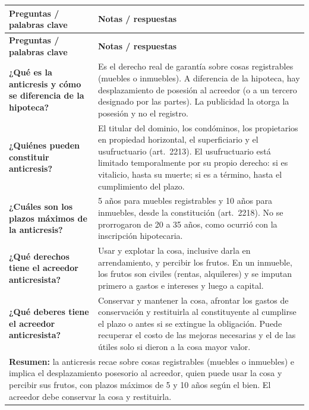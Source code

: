 \documentclass[12pt,oneside]{book}
\begin{document}
\begin{longtable}{p{}p{}}
\toprule
\textbf{Preguntas / palabras clave} & \textbf{Notas / respuestas} \\
\midrule
\endfirsthead
\toprule
\textbf{Preguntas / palabras clave} & \textbf{Notas / respuestas} \\
\midrule
\endhead

\textbf{¿Qué es la anticresis y cómo se diferencia de la hipoteca?} &
Es el derecho real de garantía sobre cosas registrables (muebles o inmuebles). A diferencia de la hipoteca, hay desplazamiento de posesión al acreedor (o a un tercero designado por las partes). La publicidad la otorga la posesión y no el registro. \\[0.6em]

\textbf{¿Quiénes pueden constituir anticresis?} &
El titular del dominio, los condóminos, los propietarios en propiedad horizontal, el superficiario y el usufructuario (art.\ 2213). El usufructuario está limitado temporalmente por su propio derecho: si es vitalicio, hasta su muerte; si es a término, hasta el cumplimiento del plazo. \\[0.6em]

\textbf{¿Cuáles son los plazos máximos de la anticresis?} &
5 años para muebles registrables y 10 años para inmuebles, desde la constitución (art.\ 2218). No se prorrogaron de 20 a 35 años, como ocurrió con la inscripción hipotecaria. \\[0.6em]

\textbf{¿Qué derechos tiene el acreedor anticresista?} &
Usar y explotar la cosa, inclusive darla en arrendamiento, y percibir los frutos. En un inmueble, los frutos son civiles (rentas, alquileres) y se imputan primero a gastos e intereses y luego a capital. \\[0.6em]

\textbf{¿Qué deberes tiene el acreedor anticresista?} &
Conservar y mantener la cosa, afrontar los gastos de conservación y restituirla al constituyente al cumplirse el plazo o antes si se extingue la obligación. Puede recuperar el costo de las mejoras necesarias y el de las útiles solo si dieron a la cosa mayor valor. \\

\midrule
\multicolumn{2}{p{\dimexpr0.93\textwidth+2\tabcolsep\relax}}{%
\textbf{Resumen:} la anticresis recae sobre cosas registrables (muebles o inmuebles) e implica el desplazamiento posesorio al acreedor, quien puede usar la cosa y percibir sus frutos, con plazos máximos de 5 y 10 años según el bien. El acreedor debe conservar la cosa y restituirla.} \\
\bottomrule
\end{longtable}
\end{document}
